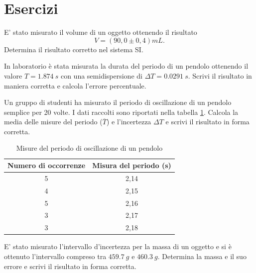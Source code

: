 \section{Esercizi}
\begin{esercizio}
E' stato misurato il volume di un oggetto ottenendo il risultato
\[
V=\left( 90,0 \pm 0,4\right)\si{mL}.
\]
Determina il risultato corretto nel sistema SI.\\
\end{esercizio}

\begin{esercizio}
In laboratorio è stata misurata la durata del periodo di un pendolo ottenendo il valore $T=\SI{1,874}{s}$ con una semidispersione di $\Delta T =\SI{0,0291}{s}$. Scrivi il risultato in maniera corretta e calcola l'errore percentuale.\\
\end{esercizio}

\begin{esercizio}
Un gruppo di studenti ha misurato il periodo di oscillazione di un pendolo semplice per 20 volte. I dati raccolti sono riportati nella tabella \ref{tab:pend}. Calcola la media delle misure del periodo (\(\overline{T}\)) e l'incertezza $\Delta T$ e scrivi il risultato in forma corretta.
\begin{table}[h!]
\centering
\caption{Misure del periodo di oscillazione di un pendolo}
\label{tab:pend}
\begin{tabular}{cc}
\toprule
\textbf{Numero di occorrenze} & \textbf{Misura del periodo (s)} \\
\midrule
5  & 2,14 \\
4  & 2,15 \\
5  & 2,16 \\
3  & 2,17 \\
3  & 2,18 \\
\bottomrule
\end{tabular}
\end{table}


\end{esercizio}


\begin{esercizio}
E' stato misurato l'intervallo d'incertezza per la massa di un oggetto e si è ottenuto l'intervallo compreso tra $\SI{459,7}{g}$ e $\SI{460,3}{g}$. Determina la massa e il suo errore e scrivi il risultato in forma corretta.\\
\end{esercizio}


